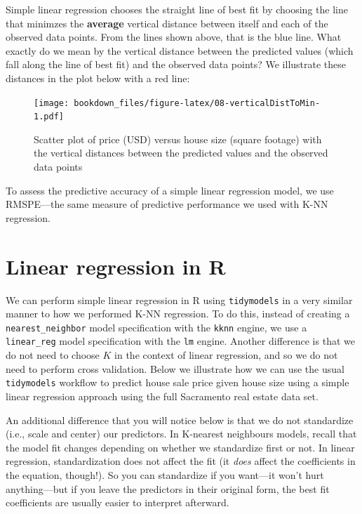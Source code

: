\documentclass[
]{krantz}
\renewenvironment{quote}{\begin{VF}}{\end{VF}}
\begin{document}
Simple linear regression chooses the straight line of best fit by choosing
the line that minimzes the \textbf{average} vertical distance between itself and
each of the observed data points. From the lines shown above, that is the blue
line. What exactly do we mean by the vertical distance between the predicted
values (which fall along the line of best fit) and the observed data points?
We illustrate these distances in the plot below with a red line:

\begin{figure}
\centering
\texttt{[image: bookdown\_files/figure-latex/08-verticalDistToMin-1.pdf]}
\caption{\label{fig:08-verticalDistToMin}Scatter plot of price (USD) versus house size (square footage) with the vertical distances between the predicted values and the observed data points}
\end{figure}

To assess the predictive accuracy of a simple linear regression model,
we use RMSPE---the same measure of predictive performance we used with K-NN regression.

\hypertarget{linear-regression-in-r}{%
\section{Linear regression in R}\label{linear-regression-in-r}}

We can perform simple linear regression in R using \texttt{tidymodels} in a
very similar manner to how we performed K-NN regression.
To do this, instead of creating a \texttt{nearest\_neighbor} model specification with
the \texttt{kknn} engine, we use a \texttt{linear\_reg} model specification
with the \texttt{lm} engine. Another difference is that we do not need to choose \(K\) in the
context of linear regression, and so we do not need to perform cross validation.
Below we illustrate how we can use the usual \texttt{tidymodels} workflow to predict house sale
price given house size using a simple linear regression approach using the full
Sacramento real estate data set.

\begin{quote}
An additional difference that you will notice below is that we do not standardize
(i.e., scale and center) our predictors. In K-nearest neighbours models, recall that
the model fit changes depending on whether we standardize first or not. In linear regression,
standardization does not affect the fit (it \emph{does} affect the coefficients in the equation, though!).
So you can standardize if you want---it won't hurt anything---but if you leave the
predictors in their original form, the best fit coefficients are usually easier to interpret afterward.
\end{quote}
\end{document}
